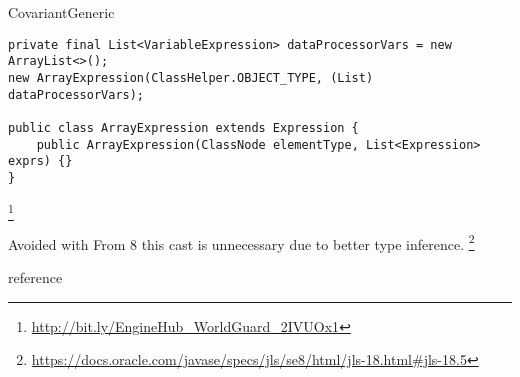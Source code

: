 \begin{pattern}{CovariantGeneric}
\begin{verbatim}
private final List<VariableExpression> dataProcessorVars = new ArrayList<>();
new ArrayExpression(ClassHelper.OBJECT_TYPE, (List) dataProcessorVars);

public class ArrayExpression extends Expression {
    public ArrayExpression(ClassNode elementType, List<Expression> exprs) {}
}
\end{verbatim}


\footnote{\url{http://bit.ly/EngineHub_WorldGuard_2IVUOx1}}


\discussion{}
Avoided with
From \java{} 8 this cast is unnecessary due to better type inference.
\footnote{\url{https://docs.oracle.com/javase/specs/jls/se8/html/jls-18.html\#jls-18.5}}

reference \cite{altidorTamingWildcardsCombining2011}

\end{pattern}